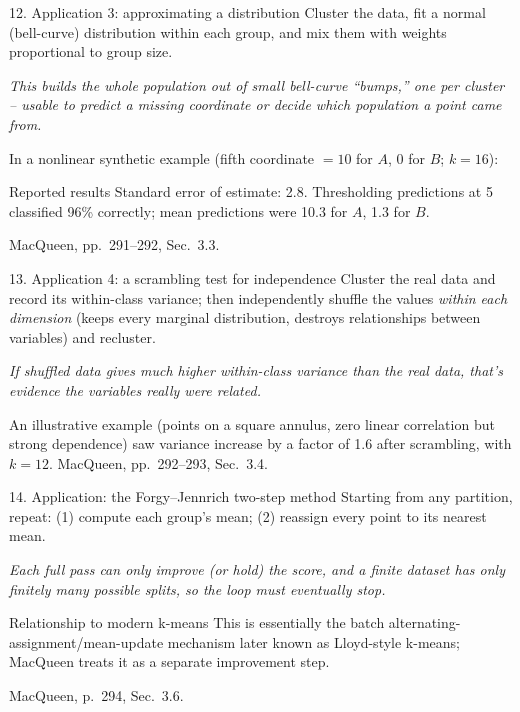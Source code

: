 \documentclass[10pt,compress]{beamer}
\newcommand{\defline}[1]{{\footnotesize\textcolor{aggiemaroon}{\textit{#1}}\par}}
\begin{document}
\begin{frame}{12. Application 3: approximating a distribution}
Cluster the data, fit a normal (bell-curve) distribution within each group, and mix them with weights proportional to group size.
\defline{This builds the whole population out of small bell-curve ``bumps,'' one per cluster -- usable to predict a missing coordinate or decide which population a point came from.}
In a nonlinear synthetic example (fifth coordinate $=10$ for $A$, $0$ for $B$; $k=16$):
\begin{block}{\footnotesize Reported results}
\small Standard error of estimate: 2.8. Thresholding predictions at 5 classified 96\% correctly; mean predictions were 10.3 for $A$, 1.3 for $B$.
\end{block}
\vfill
{\scriptsize MacQueen, pp.~291--292, Sec.~3.3.}
\end{frame}

\begin{frame}{13. Application 4: a scrambling test for independence}
\small Cluster the real data and record its within-class variance; then independently shuffle the values \emph{within each dimension} (keeps every marginal distribution, destroys relationships between variables) and recluster.
\defline{If shuffled data gives much higher within-class variance than the real data, that's evidence the variables really were related.}
An illustrative example (points on a square annulus, zero linear correlation but strong dependence) saw variance increase by a factor of 1.6 after scrambling, with $k=12$.
\vfill
{\scriptsize MacQueen, pp.~292--293, Sec.~3.4.}
\end{frame}

\begin{frame}{14. Application: the Forgy--Jennrich two-step method}
Starting from any partition, repeat: (1) compute each group's mean; (2) reassign every point to its nearest mean.
\defline{Each full pass can only improve (or hold) the score, and a finite dataset has only finitely many possible splits, so the loop must eventually stop.}
\begin{alertblock}{\footnotesize Relationship to modern k-means}
\small This is essentially the batch alternating-assignment/mean-update mechanism later known as Lloyd-style k-means; MacQueen treats it as a separate improvement step.
\end{alertblock}
\vfill
{\scriptsize MacQueen, p.~294, Sec.~3.6.}
\end{frame}

\end{document}
